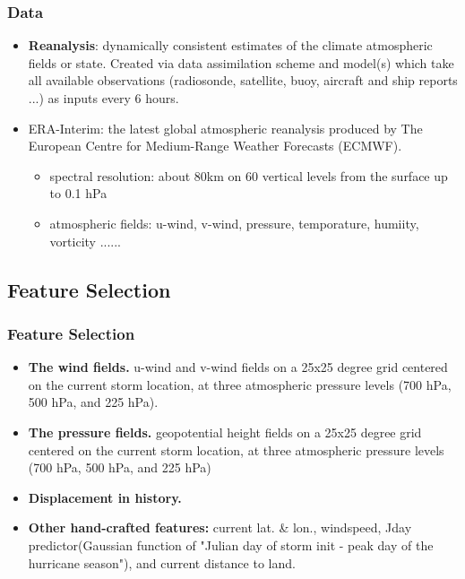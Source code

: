 \documentclass{beamer}
\begin{document}
\begin{frame}
\frametitle{Data}
\begin{itemize}
	\item  \textbf{Reanalysis}: dynamically consistent estimates of the climate atmospheric fields or state. Created via data assimilation scheme and model(s) which take all available observations (radiosonde, satellite, buoy, aircraft and ship reports ...) as inputs every 6 hours.
	\item ERA-Interim: the latest global atmospheric reanalysis produced by The European Centre for Medium-Range Weather Forecasts (ECMWF). 
	\begin{itemize}
		\item spectral resolution: about 80km on 60 vertical levels from the surface up to 0.1 hPa
		\item atmospheric fields: u-wind, v-wind, pressure, temporature, humiity, vorticity ......
	\end{itemize}
\end{itemize}
\end{frame}

\subsection{Feature Selection}
\begin{frame}
\frametitle{Feature Selection}
\begin{itemize}
	\item \textbf{The wind fields.} u-wind and v-wind fields on a 25x25 degree grid centered on the current storm location, at three atmospheric pressure levels (700 hPa, 500 hPa, and 225 hPa). 
	\item \textbf{The pressure fields.} geopotential height fields on a 25x25 degree grid centered on the current storm location, at three atmospheric pressure levels (700 hPa, 500 hPa, and 225 hPa)
	\item \textbf{Displacement in history.} 
	\item \textbf{Other hand-crafted features:} current lat. \& lon.,  windspeed, Jday predictor(Gaussian function of "Julian day of storm init - peak day of the hurricane season"\cite{demaria2005further}), and current distance to land. 
	
\end{itemize}
\end{frame}
\end{document}
